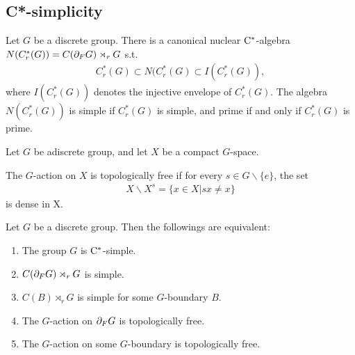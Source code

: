 \subsection{C*-simplicity}
\begin{theorem}
  Let $G$ be a discrete group.
  There is a canonical nuclear $\rm{C}^*$-algebra $N(C_r^*(G)) = C(\frak{\partial}_F G) \rtimes_r G$ s.t.
  \begin{align*}
    C_r^*(G) \subset N(C_r^*(G) \subset I(C_r^*(G)),
  \end{align*}
  where $I(C_r^*(G))$ denotes the injective envelope of $C_r^*(G)$.
  The algebra $N(C_r^*(G))$ is simple if $C_r^*(G)$ is simple,
  and prime if and only if $C_r^*(G)$ is prime.
\end{theorem}
\begin{definition}
  Let $G$ be adiscrete group, and let $X$ be a compact $G$-space.

  The $G$-action on $X$ is topologically free if for every $s \in G\backslash \{e\}$,
  the set
  \begin{align*}
    X \backslash X^s = \{x\in X|sx \neq x\}
  \end{align*}
  is dense in X.
\end{definition}
\begin{theorem}
  Let $G$ be a discrete group.
  Then the followings are equivalent:
  \begin{enumerate}
  \item The group $G$ is $\rm{C}^*$-simple.
  \item $C(\frak{\partial}_F G) \rtimes_r G$ is simple.
  \item $C(B) \rtimes_r G$ is simple for some $G$-boundary $B$.
  \item The $G$-action on $\frak{\partial}_F G$ is topologically free.
  \item The $G$-action on some $G$-boundary is topologically free.
  \end{enumerate}
\end{theorem}
